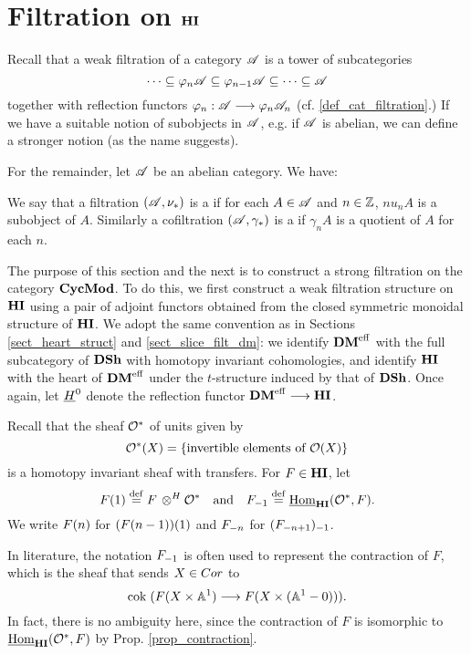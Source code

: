 \newpage
\section{Filtration on $\HI$}\label{sect_filtration_hi}

Recall that a weak filtration of a category $\Cat{A}$ is a tower 
of subcategories
\[
\cdots \subseteq \phi_n\Cat{A} \subseteq \phi_{n - 1}\Cat{A} 
   \subseteq \cdots \subseteq \Cat{A}
\]
together with reflection functors $\phi_n : \Cat{A} \to \phi_n\Cat{A}_n$
(cf. \ref{def_cat_filtration}.) If we have a suitable notion of
subobjects in $\Cat{A}$, e.g. if $\Cat{A}$ is abelian, we can 
define a stronger notion (as the name suggests).

For the remainder, let $\Cat{A}$ be an abelian category. We have:

\begin{defn}
We say that a filtration $(\Cat{A}, \nu_*)$ is a  if for each $A \in \Cat{A}$ and $n \in \Z$, $nu_n A$ is 
a subobject of $A$. Similarly a cofiltration $(\Cat{A}, \gamma_*)$ 
is a  if $\gamma_n A$ is a quotient of 
$A$ for each $n$.
\end{defn}

The purpose of this section and the next is to construct a 
strong filtration on the category $\CycMod$. To do this, we first
construct a weak filtration structure on $\HI$ using a pair
of adjoint functors obtained from the closed symmetric monoidal 
structure of $\HI$. We adopt the same convention as in Sections
\ref{sect_heart_struct} and \ref{sect_slice_filt_dm}: we identify 
$\DMeff$ with the full subcategory of $\DSh$ with homotopy 
invariant cohomologies, and identify $\HI$ with the heart of 
$\DMeff$ under the $t$-structure induced by that of $\DSh$. Once
again, let $\sheaf{H}^0$ denote the reflection functor $\DMeff
\to \HI$.

Recall that the sheaf $\Ox$ of units given by 
\[
\Ox(X) = \{\textrm{invertible elements of }\O(X)\}
\]
is a homotopy invariant sheaf with transfers. For $F \in \HI$, 
let
\[
\LHI{F} \defeq F \tHI \Ox \hspace{10pt} \textrm{and}\hspace{10pt} 
   \RHI{F} \defeq \ihomHI(\Ox, F).  
\]
We write $\LHI[n]{F}$ for $\LHI{(\LHI[n - 1]{F})}$ and 
$\RHI[n]{F}$ for $\RHI{(\RHI[n + 1]{F})}$.

\begin{rmk}\label{rmk_contract_rhi_eq}
In literature, the notation $\RHI{F}$ is often used to represent
the contraction of $F$, which is the sheaf that sends $X \in 
\Cor$ to 
\[
\cok( F(X \times \A^1) \to F(X \times (\A^1 - 0))).
\]
In fact, there is no ambiguity here, since the contraction of
$F$ is isomorphic to $\ihomHI(\Ox, F)$ by Prop. 
\ref{prop_contraction}.
\end{rmk}

